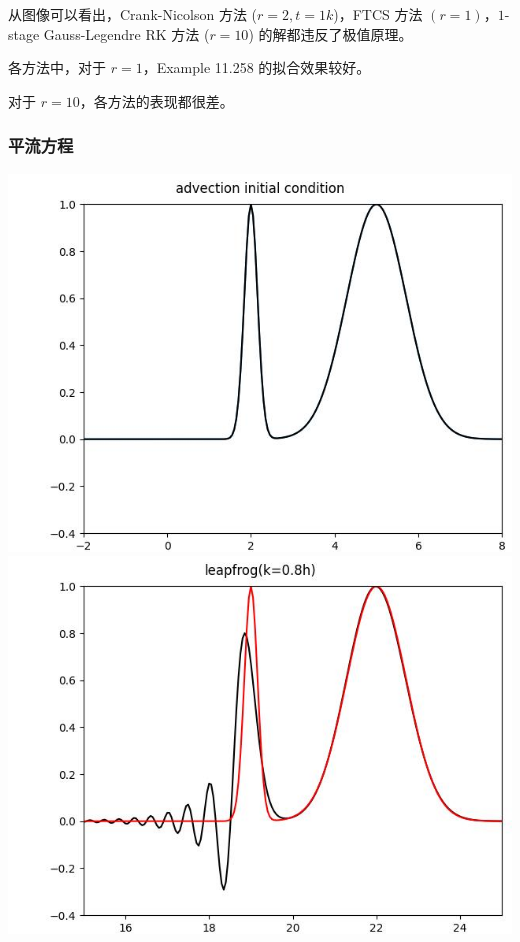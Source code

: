 \documentclass[12pt]{ctexart}
\begin{document}
从图像可以看出，Crank-Nicolson 方法 ($r=2,t=1k$)，FTCS 方法 $(r=1)$，$1$-stage Gauss-Legendre RK 方法 ($r=10$) 的解都违反了极值原理。

各方法中，对于 $r=1$，Example 11.258 的拟合效果较好。

对于 $r=10$，各方法的表现都很差。

\subsubsection*{平流方程}

\includegraphics[scale=0.52]{advection initial condition.jpg}
\includegraphics[scale=0.52]{leapfrog(k=0.8h).jpg}
\end{document}
